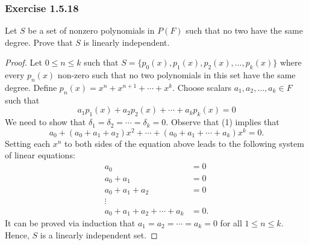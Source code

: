 \subsubsection{Exercise 1.5.18} Let \( S  \) be a set of nonzero polynomials in \( P(F) \) such that no two have the same degree. Prove that \( S  \) is linearly independent.
\begin{proof}
    Let \( 0 \leq n \leq k  \) such that \( S = \{ p_{0}(x) , p_{1}(x), p_{2}(x), \dots, p_{k}(x) \}  \) where every \( p_{n}(x) \) non-zero such that no two polynomials in this set have the same degree. Define \( p_{n }(x) =  x^{n} + x^{n+1} + \cdots + x^{k} \). Choose scalars \( a_{1} , a_{2}, \dots, a_{k } \in F  \) such that 
    \[  a_{1} p_{1}(x) + a_{2} p_{2}(x) + \cdots + a_{k } p_{k }(x) = 0 \tag{1} \]
    We need to show that \( \delta_{1} = \delta_{2} = \cdots = \delta_{k } = 0  \). Observe that (1) implies that
    \[  a_{0} + (a_{0} + a_{1} + a_{2})x^{2} + \cdots + (a_{0} + a_{1} + \cdots + a_{k})x^{k} = 0 \tag{2}.  \]
    Setting each \( x^{n} \) to both sides of the equation above leads to the following system of linear equations:
    \begin{align*}
        a_{0} &= 0  \\
        a_{0} + a_{1} &= 0  \\
        a_{0} + a_{1} + a_{2} &= 0 \\
        \vdots  \\
        a_{0} + a_{1} + a_{2} + \cdots + a_{k} &= 0.
    \end{align*}
    It can be proved via induction that \( a_{1} = a_{2} = \cdots = a_{k } = 0  \) for all \( 1 \leq n \leq  k  \). Hence, \( S  \) is a linearly independent set.
\end{proof}

